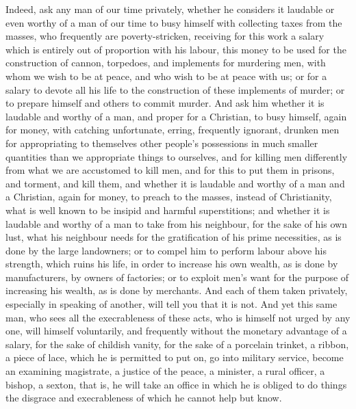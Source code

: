 \documentclass{book}
\begin{document}
Indeed, ask any man of our time privately, whether he considers it laudable or even worthy of a man of our time to busy himself with collecting taxes from the masses, who frequently are poverty-stricken, receiving for this work a salary which is entirely out of proportion with his labour, this money to be used for the construction of cannon, torpedoes, and implements for murdering men, with whom we wish to be at peace, and who wish to be at peace with us; or for a salary to devote all his life to the construction of these implements of murder; or to prepare himself and others to commit murder. And ask him whether it is laudable and worthy of a man, and proper for a Christian, to busy himself, again for money, with catching unfortunate, erring, frequently ignorant, drunken men for appropriating to themselves other people’s possessions in much smaller quantities than we appropriate things to ourselves, and for killing men differently from what we are accustomed to kill men, and for this to put them in prisons, and torment, and kill them, and whether it is laudable and worthy of a man and a Christian, again for money, to preach to the masses, instead of Christianity, what is well known to be insipid and harmful superstitions; and whether it is laudable and worthy of a man to take from his neighbour, for the sake of his own lust, what his neighbour needs for the gratification of his prime necessities, as is done by the large landowners; or to compel him to perform labour above his strength, which ruins his life, in order to increase his own wealth, as is done by manufacturers, by owners of factories; or to exploit men’s want for the purpose of increasing his wealth, as is done by merchants. And each of them taken privately, especially in speaking of another, will tell you that it is not. And yet this same man, who sees all the execrableness of these acts, who is himself not urged by any one, will himself voluntarily, and frequently without the monetary advantage of a salary, for the sake of childish vanity, for the sake of a porcelain trinket, a ribbon, a piece of lace, which he is permitted to put on, go into military service, become an examining magistrate, a justice of the peace, a minister, a rural officer, a bishop, a sexton, that is, he will take an office in which he is obliged to do things the disgrace and execrableness of which he cannot help but know.
\end{document}
